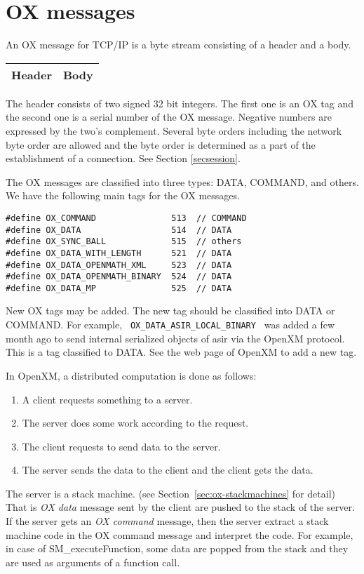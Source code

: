 
\section{OX messages}

An OX message for TCP/IP is a byte stream consisting of
a header and a body.
\begin{center}
\begin{tabular}{|c|c|}
\hline
Header	& \hspace{10mm} Body \hspace{10mm} \\
\hline
\end{tabular}
\end{center}
The header consists of two signed 32 bit integers.
The first one is an OX tag 
and the second one is a serial number of the OX message.
Negative numbers are expressed by the two's complement.
Several byte orders including the network byte order
are allowed and the byte order is determined as a part of
the establishment of a connection. See Section \ref{secsession}.

The OX messages are classified into three types:
DATA, COMMAND, and others.
We have the following main tags for the OX messages.
\begin{verbatim}
#define	OX_COMMAND               513  // COMMAND
#define	OX_DATA	                 514  // DATA
#define OX_SYNC_BALL             515  // others
#define OX_DATA_WITH_LENGTH      521  // DATA
#define OX_DATA_OPENMATH_XML     523  // DATA
#define OX_DATA_OPENMATH_BINARY  524  // DATA
#define OX_DATA_MP               525  // DATA
\end{verbatim}

New OX tags may be added.
The new tag should be classified into DATA or COMMAND.
For example, \verb+ OX_DATA_ASIR_LOCAL_BINARY +  was added a few month ago
to send internal serialized objects of asir via the OpenXM protocol.
This is a tag classified to DATA.
See the web page of OpenXM to add a new tag.

In OpenXM, a distributed computation is done as follows:
\begin{enumerate}
\item A client requests something to a server.
\item The server does some work according to the request.
\item The client requests to send data to the server.
\item The server sends the data to the client and the client gets the data.
\end{enumerate}
The server is a stack machine. (see Section~\ref{sec:ox-stackmachines}
for detail)
That is {\it OX data} message sent by the client
are pushed to the stack of the server. 
If the server gets an {\it OX command} message, then the server extract
a stack machine code in the OX command message and interpret the code.
For example, in case of SM\_executeFunction, some data are popped from
the stack and they are used as arguments of a function call.

